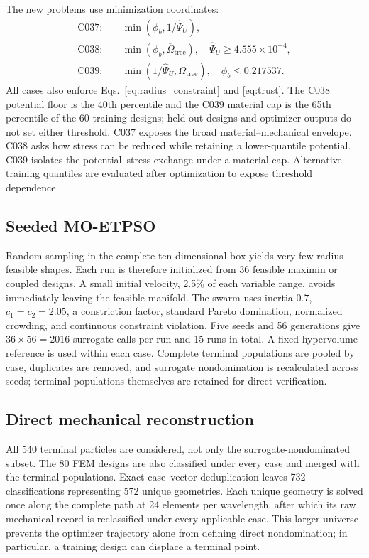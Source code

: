 \documentclass[11pt]{article}
\newcommand{\phib}{\phi_{b}}
\begin{document}
The new problems use minimization coordinates:
\begin{align}
\mathrm{C037}:&\quad \min(\phib,1/\widehat\Psi_U),\label{eq:c037}\\
\mathrm{C038}:&\quad \min(\phib,\overline\Omega_{\mathrm{tree}}),
\quad \widehat\Psi_U\ge4.555\times10^{-4},\label{eq:c038}\\
\mathrm{C039}:&\quad \min(1/\widehat\Psi_U,\overline\Omega_{\mathrm{tree}}),
\quad \phib\le0.217537.
\label{eq:c039}
\end{align}
All cases also enforce Eqs.~\eqref{eq:radius_constraint} and \eqref{eq:trust}. The C038 potential floor is the 40th percentile and the C039 material cap is the 65th percentile of the 60 training designs; held-out designs and optimizer outputs do not set either threshold. C037 exposes the broad material--mechanical envelope. C038 asks how stress can be reduced while retaining a lower-quantile potential. C039 isolates the potential--stress exchange under a material cap. Alternative training quantiles are evaluated after optimization to expose threshold dependence.

\subsection{Seeded MO-ETPSO}

Random sampling in the complete ten-dimensional box yields very few radius-feasible shapes. Each run is therefore initialized from 36 feasible maximin or coupled designs. A small initial velocity, 2.5\% of each variable range, avoids immediately leaving the feasible manifold. The swarm uses inertia $0.7$, $c_1=c_2=2.05$, a constriction factor, standard Pareto domination, normalized crowding, and continuous constraint violation. Five seeds and 56 generations give $36\times56=2016$ surrogate calls per run and 15 runs in total. A fixed hypervolume reference is used within each case. Complete terminal populations are pooled by case, duplicates are removed, and surrogate nondomination is recalculated across seeds; terminal populations themselves are retained for direct verification.

\subsection{Direct mechanical reconstruction}

All 540 terminal particles are considered, not only the surrogate-nondominated subset. The 80 FEM designs are also classified under every case and merged with the terminal populations. Exact case--vector deduplication leaves 732 classifications representing 572 unique geometries. Each unique geometry is solved once along the complete path at 24 elements per wavelength, after which its raw mechanical record is reclassified under every applicable case. This larger universe prevents the optimizer trajectory alone from defining direct nondomination; in particular, a training design can displace a terminal point.
\end{document}
